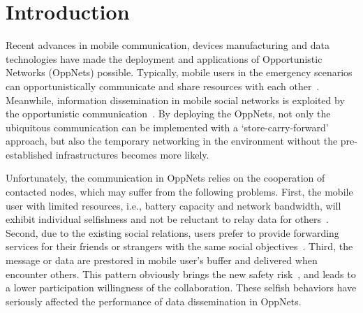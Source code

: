 \section{Introduction}
\label{sec:intro}
Recent advances in mobile communication,
devices manufacturing and data technologies have
made the deployment and applications of Opportunistic Networks
(OppNets) possible.
Typically,
mobile users in the emergency scenarios can
opportunistically communicate and share
resources with each other~\cite{DBLP:journals/tsc/KhalidKKZ14,
DBLP:journals/tmc/ChatzopoulosAKH18,
DBLP:journals/tmc/LiQJHW014}.
Meanwhile,
information dissemination
in mobile social networks is exploited by
the opportunistic communication~\cite{DBLP:journals/tmc/HanHKMSS12}.
By deploying the OppNets,
not only the ubiquitous communication can be
implemented with a `store-carry-forward' approach,
but also the temporary networking
in the environment without the pre-established infrastructures
becomes more likely.

Unfortunately,
the communication in OppNets relies on
the cooperation of contacted nodes,
which may suffer from the following problems.
First,
the mobile user with limited resources,
i.e.,
battery capacity
and network bandwidth,
will exhibit individual selfishness and not be
reluctant to relay data for others~\cite{DBLP:journals/comsur/JedariXN18}.
Second,
due to the existing social relations,
users prefer to
provide forwarding services for their friends or strangers
with the same social objectives~\cite{DBLP:journals/tmc/HanHKMSS12}.
Third,
the message or data are prestored in mobile user's buffer
and delivered when encounter others.
This pattern obviously brings 
the new safety risk~\cite{Saha2018Design},
and leads to a lower participation willingness of the collaboration.
These selfish behaviors have seriously
affected the performance
of data dissemination in OppNets.



